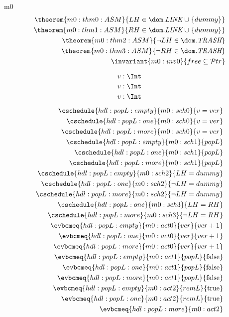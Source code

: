 \documentclass[12pt]{amsart}
\newcommand{\Addr}{\mathcal{P}tr}
\newcommand{\link}{\textit{LINK}}
\newcommand{\trash}{\textit{TRASH}}
\begin{document}
\begin{machine}{m0}
\begin{align*}
  \theorem{m0:thm0:ASM}{ LH \in \dom.\link \bunion \{ dummy \} } \\
  \theorem{m0:thm1:ASM}{ RH \in \dom.\link \bunion \{ dummy \} } \\
  \theorem{m0:thm2:ASM}{ \neg LH \in \dom.\trash  } \\
  \theorem{m0:thm3:ASM}{ \neg RH \in \dom.\trash  } \\
  \invariant{m0:inv0}{ free \subseteq \Addr }
\end{align*}

\[ \indices{hdl:popL:empty}{ v : \Int } \]
\[ \indices{hdl:popL:one}{ v : \Int } \]
\[ \indices{hdl:popL:more}{ v : \Int } \]

\begin{align*}
  \cschedule{hdl:popL:empty}{m0:sch0}{v = ver} \\
  \cschedule{hdl:popL:one}{m0:sch0}{v = ver} \\
  \cschedule{hdl:popL:more}{m0:sch0}{v = ver} \\
  \cschedule{hdl:popL:empty}{m0:sch1}{popL} \\
  \cschedule{hdl:popL:one}{m0:sch1}{popL} \\
  \cschedule{hdl:popL:more}{m0:sch1}{popL} \\
  \cschedule{hdl:popL:empty}{m0:sch2}{LH = dummy} \\
  \cschedule{hdl:popL:one}{m0:sch2}{\neg LH = dummy} \\
  \cschedule{hdl:popL:more}{m0:sch2}{\neg LH = dummy} \\
  \cschedule{hdl:popL:one}{m0:sch3}{LH = RH} \\
  \cschedule{hdl:popL:more}{m0:sch3}{\neg LH = RH} \\
  \evbcmeq{hdl:popL:empty}{m0:act0}
    {ver}{ver + 1} \\
  \evbcmeq{hdl:popL:one}{m0:act0}
    {ver}{ver + 1} \\
  \evbcmeq{hdl:popL:more}{m0:act0}
    {ver}{ver + 1} \\
  \evbcmeq{hdl:popL:empty}{m0:act1}
    {popL}{\false} \\
  \evbcmeq{hdl:popL:one}{m0:act1}
    {popL}{\false} \\
  \evbcmeq{hdl:popL:more}{m0:act1}
    {popL}{\false} \\
  \evbcmeq{hdl:popL:empty}{m0:act2}
    {remL}{\true} \\
  \evbcmeq{hdl:popL:one}{m0:act2}
    {remL}{\true} \\
  \evbcmeq{hdl:popL:more}{m0:act2}

\end{align*}
\end{machine}
\end{document}
